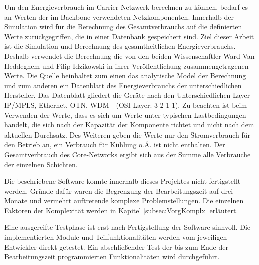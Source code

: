 Um den Energieverbrauch im Carrier-Netzwerk berechnen zu können, bedarf es an Werten der im Backbone verwendeten Netzkomponenten. Innerhalb der Simulation wird für die Berechnung des Gesamtverbrauchs auf die definierten Werte zurückgegriffen, die in einer Datenbank gespeichert sind. Ziel dieser Arbeit ist die Simulation und Berechnung des gesamtheitlichen Energieverbrauchs. Deshalb verwendet die Berechnung die von den beiden Wissenschaftler Ward Van Heddeghem und Filip Idzikowski in ihrer Veröffentlichung \cite{vanhedde} zusammengetragenen Werte. Die Quelle beinhaltet zum einen das analytische Model der Berechnung und zum anderen ein Datenblatt \cite{vanhsheet} des Energieverbrauchs der unterschiedlichen Hersteller. Das Datenblatt gliedert die Geräte nach den Unterschiedlichen Layer IP/MPLS, Ethernet, OTN, WDM - (OSI-Layer: 3-2-1-1). Zu beachten ist beim Verwenden der Werte, dass es sich um Werte unter typischen Lastbedingungen handelt, die sich nach der Kapazität der Komponente richtet und nicht nach dem aktuellen Durchsatz. Des Weiteren geben die Werte nur den Stromverbrauch für den Betrieb an, ein Verbrauch für Kühlung o.Ä. ist nicht enthalten.
Der Gesamtverbrauch des Core-Networks ergibt sich aus der Summe alle Verbrauche der einzelnen Schichten.



Die beschriebene Software konnte innerhalb dieses Projektes nicht fertigstellt werden. Gründe dafür waren die Begrenzung der Bearbeitungszeit auf drei Monate und vermehrt auftretende komplexe Problemstellungen. Die einzelnen Faktoren der Komplexität werden in Kapitel \ref{subsec:VorgKomplx} erläutert.


Eine ausgereifte Testphase ist erst nach Fertigstellung der Software sinnvoll. Die implementierten Module und Teilfunktionalitäten werden vom jeweiligen Entwickler direkt getestet. Ein abschließender Test der bis zum Ende der Bearbeitungszeit programmierten Funktionalitäten wird durchgeführt.






